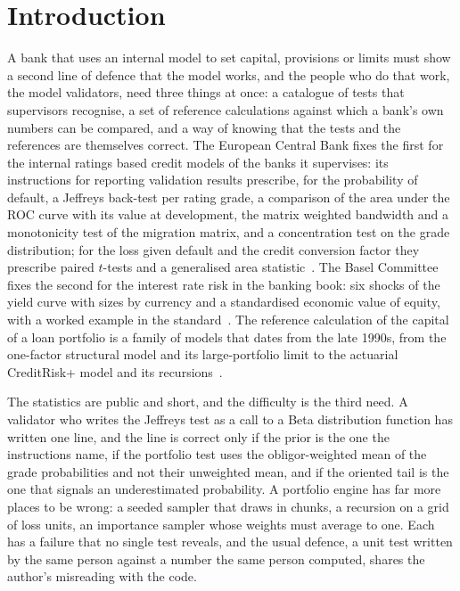 \section{Introduction}
\label{sec:introduction}

A bank that uses an internal model to set capital, provisions or limits must show a second line of defence that the model works, and the people who do that work, the model validators, need three things at once: a catalogue of tests that supervisors recognise, a set of reference calculations against which a bank's own numbers can be compared, and a way of knowing that the tests and the references are themselves correct. The European Central Bank fixes the first for the internal ratings based credit models of the banks it supervises: its instructions for reporting validation results prescribe, for the probability of default, a Jeffreys back-test per rating grade, a comparison of the area under the ROC curve with its value at development, the matrix weighted bandwidth and a monotonicity test of the migration matrix, and a concentration test on the grade distribution; for the loss given default and the credit conversion factor they prescribe paired $t$-tests and a generalised area statistic~\citep{ecb2019}. The Basel Committee fixes the second for the interest rate risk in the banking book: six shocks of the yield curve with sizes by currency and a standardised economic value of equity, with a worked example in the standard~\citep{bcbssrp31,bcbsd368}. The reference calculation of the capital of a loan portfolio is a family of models that dates from the late 1990s, from the one-factor structural model and its large-portfolio limit to the actuarial CreditRisk+ model and its recursions~\citep{gordy2003,gordy2000,haaf2004}.

The statistics are public and short, and the difficulty is the third need. A validator who writes the Jeffreys test as a call to a Beta distribution function has written one line, and the line is correct only if the prior is the one the instructions name, if the portfolio test uses the obligor-weighted mean of the grade probabilities and not their unweighted mean, and if the oriented tail is the one that signals an underestimated probability. A portfolio engine has far more places to be wrong: a seeded sampler that draws in chunks, a recursion on a grid of loss units, an importance sampler whose weights must average to one. Each has a failure that no single test reveals, and the usual defence, a unit test written by the same person against a number the same person computed, shares the author's misreading with the code.

